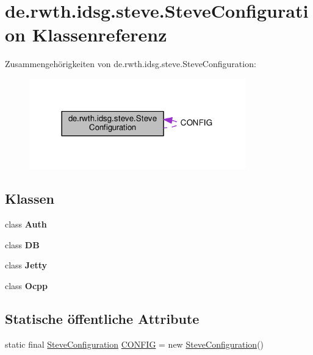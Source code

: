\hypertarget{classde_1_1rwth_1_1idsg_1_1steve_1_1_steve_configuration}{\section{de.\+rwth.\+idsg.\+steve.\+Steve\+Configuration Klassenreferenz}
\label{classde_1_1rwth_1_1idsg_1_1steve_1_1_steve_configuration}
}


Zusammengehörigkeiten von de.\+rwth.\+idsg.\+steve.\+Steve\+Configuration\+:\nopagebreak
\begin{figure}[H]
\begin{center}
\leavevmode
\includegraphics[width=266pt]{classde_1_1rwth_1_1idsg_1_1steve_1_1_steve_configuration__coll__graph}
\end{center}
\end{figure}
\subsection*{Klassen}
\begin{DoxyCompactItemize}
\item 
class {\bfseries Auth}
\item 
class {\bfseries D\+B}
\item 
class {\bfseries Jetty}
\item 
class {\bfseries Ocpp}
\end{DoxyCompactItemize}
\subsection*{Statische öffentliche Attribute}
\begin{DoxyCompactItemize}
\item 
static final \hyperlink{classde_1_1rwth_1_1idsg_1_1steve_1_1_steve_configuration}{Steve\+Configuration} \hyperlink{classde_1_1rwth_1_1idsg_1_1steve_1_1_steve_configuration_ac544b11e403f400330d7b210c2c6c2a8}{C\+O\+N\+F\+I\+G} = new \hyperlink{classde_1_1rwth_1_1idsg_1_1steve_1_1_steve_configuration}{Steve\+Configuration}()
\end{DoxyCompactItemize}


